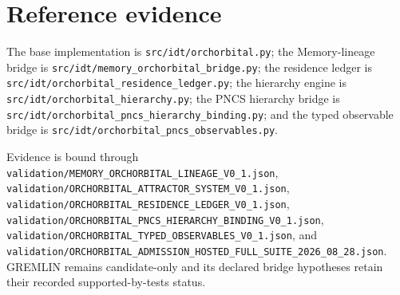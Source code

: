 \section{Reference evidence}

The base implementation is \texttt{src/idt/orchorbital.py}; the Memory-lineage bridge is \texttt{src/idt/memory\_orchorbital\_bridge.py}; the residence ledger is \texttt{src/idt/orchorbital\_residence\_ledger.py}; the hierarchy engine is \texttt{src/idt/orchorbital\_hierarchy.py}; the PNCS hierarchy bridge is \texttt{src/idt/orchorbital\_pncs\_hierarchy\_binding.py}; and the typed observable bridge is \texttt{src/idt/orchorbital\_pncs\_observables.py}.

Evidence is bound through \texttt{validation/MEMORY\_ORCHORBITAL\_LINEAGE\_V0\_1.json}, \texttt{validation/ORCHORBITAL\_ATTRACTOR\_SYSTEM\_V0\_1.json}, \texttt{validation/ORCHORBITAL\_RESIDENCE\_LEDGER\_V0\_1.json}, \texttt{validation/ORCHORBITAL\_PNCS\_HIERARCHY\_BINDING\_V0\_1.json}, \texttt{validation/ORCHORBITAL\_TYPED\_OBSERVABLES\_V0\_1.json}, and \texttt{validation/ORCHORBITAL\_ADMISSION\_HOSTED\_FULL\_SUITE\_2026\_08\_28.json}. GREMLIN remains candidate-only and its declared bridge hypotheses retain their recorded supported-by-tests status.
